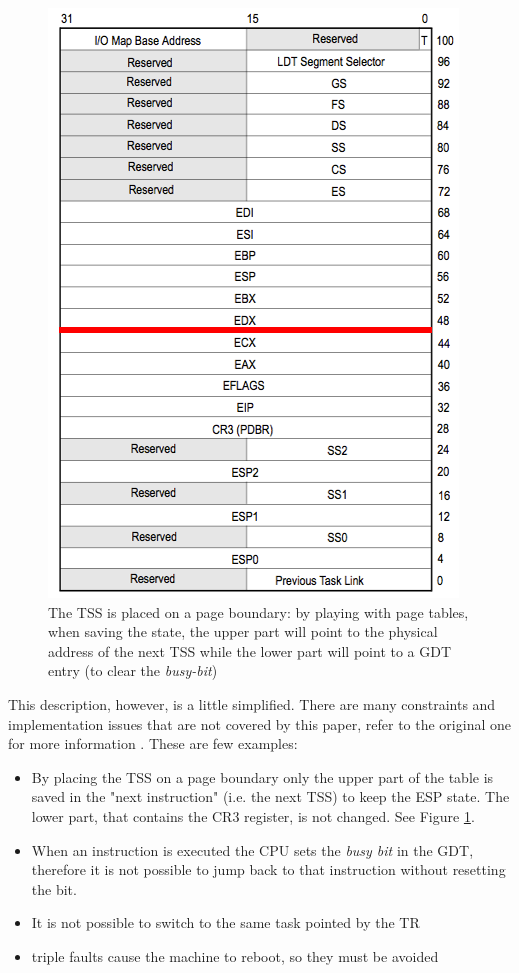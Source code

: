 \documentclass[11pt,twoside,a4paper]{article}
\begin{document}
\begin{figure}[ht]
\centering
\includegraphics[scale=0.30]{tss.png}
\captionsetup{width=13.5cm}
\caption{The TSS is placed on a page boundary: by playing with page tables, when saving the state, the upper part will point to the physical address of the next TSS while the lower part will point to a GDT entry (to clear the \emph{busy-bit}) \cite{intel}
}
\label{TSS_fig}
\end{figure}

This description, however, is a little simplified. There are many constraints and implementation issues that are not covered by this paper, refer to the original one for more information \cite{mmu_machine}. These are few examples:
\begin{itemize}
\item By placing the TSS on a page boundary only the upper part of the table is saved in the "next instruction" (i.e. the next TSS) to keep the ESP state. The lower part, that contains the CR3 register, is not changed. See Figure \ref{TSS_fig}.
\item When an instruction is executed the CPU sets the \emph{busy bit} in the GDT, therefore it is not possible to jump back to that instruction without resetting the bit.
\item It is not possible to switch to the same task pointed by the TR
\item triple faults cause the machine to reboot, so they must be avoided
\end{itemize}
\end{document}
